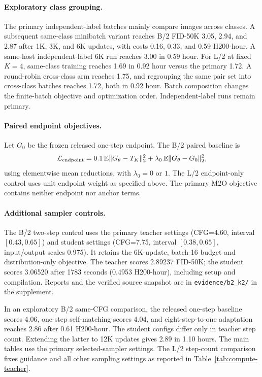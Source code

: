 \paragraph{Exploratory class grouping.}
The primary independent-label batches mainly compare images across classes.
A subsequent same-class minibatch variant reaches B/2 FID-50K 3.05, 2.94,
and 2.87 after 1K, 3K, and 6K updates, with costs 0.16, 0.33, and 0.59
H200-hour. A same-host independent-label 6K run reaches 3.00 in 0.59 hour.
For L/2 at fixed $K=4$, same-class training reaches 1.69 in 0.92 hour versus
the primary 1.72. A round-robin cross-class arm reaches 1.75, and regrouping
the same pair set into cross-class batches reaches 1.72, both in 0.92 hour.
Batch composition changes the finite-batch objective and optimization order.
Independent-label runs remain primary.

\paragraph{Paired endpoint objectives.}
Let $G_0$ be the frozen released one-step endpoint. The B/2 paired baseline is
\begin{equation}
\mathcal L_{\rm endpoint}
=0.1\,\mathbb E\|G_\theta-T_K\|_2^2
+\lambda_0\,\mathbb E\|G_\theta-G_0\|_2^2,
\label{eq:endpoint}
\end{equation}
using elementwise mean reductions, with $\lambda_0=0$ or $1$.
The L/2 endpoint-only control uses unit endpoint weight as specified above.
The primary M2O objective contains neither endpoint nor anchor terms.

\paragraph{Additional sampler controls.}
The B/2 two-step control uses the primary teacher settings
(CFG=4.60, interval $[0.43,0.65]$) and student settings
(CFG=7.75, interval $[0.38,0.65]$, input/output scales 0.975).
It retains the 6K-update, batch-16 budget and distribution-only objective.
The teacher scores 2.89237 FID-50K; the student scores 3.06520 after
1783 seconds (0.4953 H200-hour), including setup and compilation.
Reports and the verified source snapshot are in
\texttt{evidence/b2\_k2/} in the supplement.

In an exploratory B/2 same-CFG comparison, the released one-step baseline
scores 4.06, one-step self-matching scores 4.04, and eight-step-to-one
adaptation reaches 2.86 after 0.61 H200-hour. The student configs differ only
in teacher step count. Extending the latter to 12K updates gives 2.89 in
1.10 hours. The main tables use the primary selected-sampler settings.
The L/2 step-count comparison fixes guidance and all other sampling settings
as reported in Table~\ref{tab:compute-teacher}.

